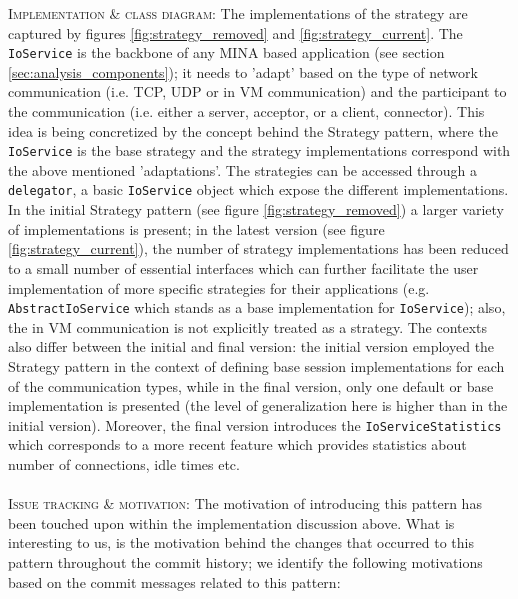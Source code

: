 \textsc{Implementation \& class diagram}: The implementations of the strategy are captured by figures \ref{fig:strategy_removed} and \ref{fig:strategy_current}. The \texttt{IoService} is the backbone of any MINA based application (see section \ref{sec:analysis_components}); it needs to 'adapt' based on the type of network communication (i.e. TCP, UDP or in VM communication) and the participant to the communication (i.e. either a server, acceptor, or a client, connector). This idea is being concretized by the concept behind the Strategy pattern, where the \texttt{IoService} is the base strategy and the strategy implementations correspond with the above mentioned 'adaptations'. The strategies can be accessed through a \texttt{delegator}, a basic \texttt{IoService} object which expose the different implementations. In the initial Strategy pattern (see figure \ref{fig:strategy_removed}) a larger variety of implementations is present; in the latest version (see figure \ref{fig:strategy_current}), the number of strategy implementations has been reduced to a small number of essential interfaces which can further facilitate the user implementation of more specific strategies for their applications (e.g. \texttt{AbstractIoService} which stands as a base implementation for \texttt{IoService}); also, the in VM communication is not explicitly treated as a strategy. The contexts also differ between the initial and final version: the initial version employed the Strategy pattern in the context of defining base session implementations for each of the communication types, while in the final version, only one default or base implementation is presented (the level of generalization here is higher than in the initial version). Moreover, the final version introduces the \texttt{IoServiceStatistics} which corresponds to a more recent feature which provides statistics about number of connections, idle times etc.\\\\
\textsc{Issue tracking \&  motivation}: The motivation of introducing this pattern has been touched upon within the implementation discussion above. What is interesting to us, is the motivation behind the changes that occurred to this pattern throughout the commit history; we identify the following motivations based on the commit messages related to this pattern:
